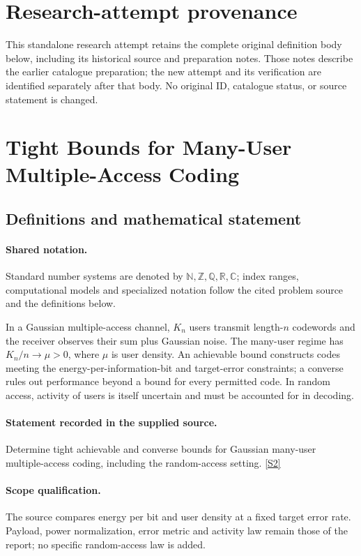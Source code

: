 \documentclass[11pt]{article}
\begin{document}
\section*{Research-attempt provenance}
This standalone research attempt retains the complete original definition body below,
including its historical source and preparation notes. Those notes describe the
earlier catalogue preparation; the new attempt and its verification are identified
separately after that body. No original ID, catalogue status, or source statement is changed.

\section{Tight Bounds for Many-User Multiple-Access Coding}\label{statement}

\subsection{Definitions and mathematical statement}

\paragraph{Shared notation.}Standard number systems are denoted by $\mathbb N,\mathbb Z,\mathbb Q,\mathbb R,\mathbb C$; index ranges, computational models and specialized notation follow the cited problem source and the definitions below.


In a Gaussian multiple-access channel, $K_n$ users transmit length-$n$ codewords and the receiver observes their sum plus Gaussian noise. The many-user regime has $K_n/n\to\mu>0$, where $\mu$ is user density. An achievable bound constructs codes meeting the energy-per-information-bit and target-error constraints; a converse rules out performance beyond a bound for every permitted code. In random access, activity of users is itself uncertain and must be accounted for in decoding.
\paragraph{Statement recorded in the supplied source.}
Determine tight achievable and converse bounds for Gaussian many-user multiple-access coding, including the random-access setting. \href{https://doi.org/10.4171/owr/2022/14}{[S2]}
\paragraph{Scope qualification.}
The source compares energy per bit and user density at a fixed target error rate. Payload, power normalization, error metric and activity law remain those of the report; no specific random-access law is added.
\end{document}
